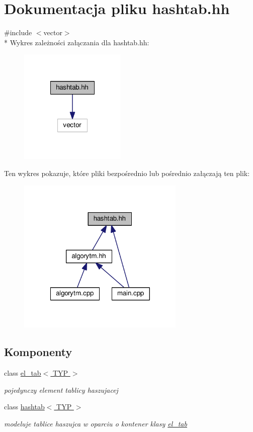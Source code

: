 \hypertarget{hashtab_8hh}{\section{Dokumentacja pliku hashtab.\-hh}
\label{hashtab_8hh}
}
{\ttfamily \#include $<$vector$>$}\\*
Wykres zależności załączania dla hashtab.\-hh\-:\nopagebreak
\begin{figure}[H]
\begin{center}
\leavevmode
\includegraphics[width=144pt]{hashtab_8hh__incl}
\end{center}
\end{figure}
Ten wykres pokazuje, które pliki bezpośrednio lub pośrednio załączają ten plik\-:\nopagebreak
\begin{figure}[H]
\begin{center}
\leavevmode
\includegraphics[width=226pt]{hashtab_8hh__dep__incl}
\end{center}
\end{figure}
\subsection*{Komponenty}
\begin{DoxyCompactItemize}
\item 
class \hyperlink{classel__tab}{el\-\_\-tab$<$ T\-Y\-P $>$}
\begin{DoxyCompactList}\small\item\em pojedynczy element tablicy haszujacej \end{DoxyCompactList}\item 
class \hyperlink{classhashtab}{hashtab$<$ T\-Y\-P $>$}
\begin{DoxyCompactList}\small\item\em modeluje tablice haszujca w oparciu o kontener klasy \hyperlink{classel__tab}{el\-\_\-tab} \end{DoxyCompactList}\end{DoxyCompactItemize}


